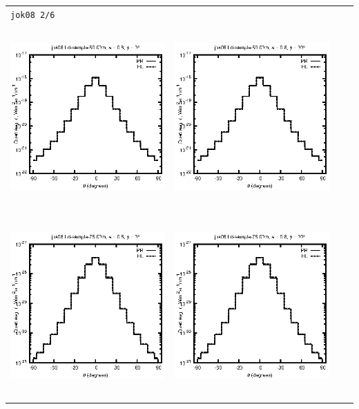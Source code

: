 \begin{tabular}{c c c c}
\multicolumn{4}{l}{\texttt{jok08 2/6}} \\
\includegraphics[height=7cm]{../eps/jok08_Ld_sample_50.00m_fwd.eps} &
\includegraphics[height=7cm]{../eps/jok08_Ld_sample_50.00m_cross.eps} \\
\includegraphics[height=7cm]{../eps/jok08_Ld_sample_75.00m_fwd.eps} &
\includegraphics[height=7cm]{../eps/jok08_Ld_sample_75.00m_cross.eps} \\

\end{tabular}
